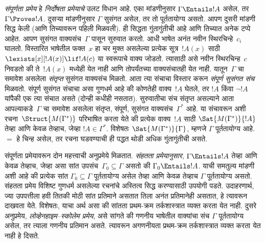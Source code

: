 \emph{संपूर्णता प्रमेय} हे \emph{निर्दोषता प्रमेयाचे} उलट विधान आहे. एका मांडणीनुसार $\Gamma \Entails !A$ असेल, तर $\Gamma \Proves !A$. दुसऱ्या मांडणीनुसार $\Gamma$ सुसंगत असेल, तर तो पूर्ततायोग्य असतो. आपण दुसरी मांडणी सिद्ध केली (आणि तिच्यावरून पहिली मिळवली). ही सिद्धता गुंतागुंतीची आहे आणि तिच्यात अनेक टप्पे आहेत. आपण सुसंगत वाक्यसंच~$\Gamma$ पासून सुरुवात करतो. आधी भाषेत अनंत नवीन स्थिरचिन्हे~$c_i$ घालतो. विस्तारित भाषेतील फक्त~$x$ हा चर मुक्त असलेल्या प्रत्येक सूत्र~$!A(x)$ साठी $\lexists[x][!A(x)] \lif !A(c)$ या स्वरूपाचे वाक्य जोडतो. त्यासाठी असे नवीन स्थिरचिन्ह~$c$ निवडतो की ते~$!A(x)$ मध्येही येत नाही आणि तोपर्यंतच्या वाक्यसंचातही येत नाही. यातून~$\Gamma$ चा समावेश असलेला \emph{संतृप्त} सुसंगत वाक्यसंच मिळतो. आता त्या संचाचा विस्तार करून \emph{संपूर्ण सुसंगत संच} मिळवतो. संपूर्ण सुसंगत संचाचा असा गुणधर्म आहे की कोणतेही वाक्य~$!A$ घेतले, तर $!A$ किंवा $\lnot !A$ यांपैकी एक त्या संचात असते (दोन्ही कधीही नसतात). सुरुवातीचा संच संतृप्त असल्याने आता आपल्याकडे~$\Gamma$ चा समावेश असलेला संतृप्त, संपूर्ण, सुसंगत वाक्यसंच~$\Gamma^*$ आहे. या संचावरून अशी रचना~$\Struct{M(\Gamma^*)}$ परिभाषित करता येते की प्रत्येक वाक्य~$!A$ साठी $\Sat{M(\Gamma^*)}{!A}$ तेव्हा आणि केवळ तेव्हाच, जेव्हा $!A \in \Gamma^*$. विशेषतः $\Sat{M(\Gamma^*)}{\Gamma}$, म्हणजे $\Gamma$ पूर्ततायोग्य आहे. $=$ हे चिन्ह असेल, तर रचना घडवण्याची ही पद्धत थोडी अधिक गुंतागुंतीची असते.

संपूर्णता प्रमेयावरून दोन महत्त्वाची अनुप्रमेये मिळतात. \emph{संहतता प्रमेयानुसार}, $\Gamma \Entails !A$ तेव्हा आणि केवळ तेव्हाच, जेव्हा असा सांत उपसंच~$\Gamma_0 \subseteq \Gamma$ असतो की $\Gamma_0 \Entails !A$. याची समतुल्य मांडणी अशी आहे की प्रत्येक सांत $\Gamma_0 \subseteq \Gamma$ पूर्ततायोग्य असेल तेव्हा आणि केवळ तेव्हाच $\Gamma$ पूर्ततायोग्य असतो. संहतता प्रमेय विशिष्ट गुणधर्म असलेल्या रचनांचे अस्तित्व सिद्ध करण्यासाठी उपयोगी पडते. उदाहरणार्थ, ज्या उपपत्तीला हवी तितकी मोठी सांत प्रतिमाने असतात तिला अनंत प्रतिमानेही असतात, हे त्यावरून दाखवता येते. विशेषतः, याचा अर्थ असा की सांतता प्रथम-क्रम तर्कशास्त्रात व्यक्त करता येत नाही. दुसरे अनुप्रमेय, \emph{लोव्हेनहाइम--स्कोलेम प्रमेय}, असे सांगते की गणनीय भाषेतील वाक्यांचा संच $\Gamma$ पूर्ततायोग्य असेल, तर त्याला गणनीय प्रतिमान असते. त्यावरून अगणनीयता प्रथम-क्रम तर्कशास्त्रात व्यक्त करता येत नाही हे दिसते.
